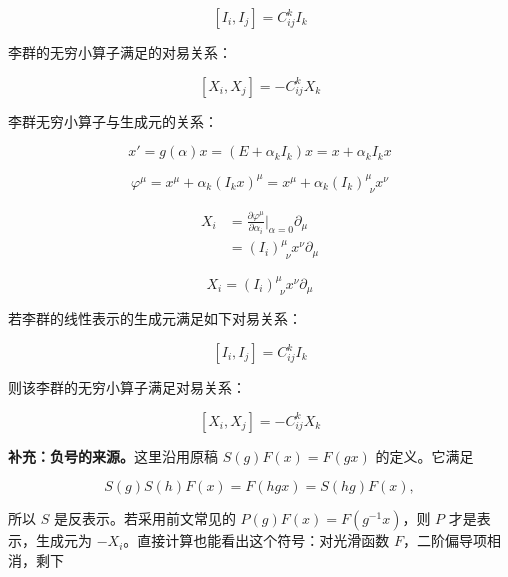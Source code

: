 \begin{equation}
\left[I_i,I_j \right] = C_{ij}^k I_k
\end{equation}

李群的无穷小算子满足的对易关系：

\begin{equation}
\left[X_i,X_j \right] = -C_{ij}^k X_k
\end{equation}

李群无穷小算子与生成元的关系：

\begin{equation}
x'
=g\left(\alpha\right) x
=\left(E+\alpha_k I_k \right) x
=x + \alpha_k I_k x
\end{equation}

\begin{equation}
\varphi^\mu
=x^\mu + \alpha_k \left(I_k x \right)^\mu
=x^\mu + \alpha_k \left(I_k \right)^{\mu}_{~~\nu} x^{\nu}
\end{equation}

\begin{align}
X_i
&=\frac{\partial \varphi^\mu }{\partial \alpha_i } \bigg|_{\alpha=0} \partial_\mu \\
&=\left(I_i \right)^\mu_{~~\nu} x^{\nu} \partial_\mu
\end{align}

\begin{equation}
X_i = \left(I_i \right)^{\mu}_{~~\nu} x^{\nu} \partial_\mu
\end{equation}

若李群的线性表示的生成元满足如下对易关系：

\begin{equation}
\left[I_i,I_j \right] = C_{ij}^k I_k
\end{equation}

则该李群的无穷小算子满足对易关系：

\begin{equation}
\left[X_i,X_j \right] = -C_{ij}^k X_k
\end{equation}

\textbf{补充：负号的来源。}这里沿用原稿 $S\left(g\right)F\left(x\right)=F\left(gx\right)$ 的定义。它满足

\begin{equation}
S\left(g\right)S\left(h\right)F\left(x\right)=F\left(hgx\right)=S\left(hg\right)F\left(x\right),
\end{equation}

所以 $S$ 是反表示。若采用前文常见的 $P\left(g\right)F\left(x\right)=F\left(g^{-1}x\right)$，则 $P$ 才是表示，生成元为 $-X_i$。直接计算也能看出这个符号：对光滑函数 $F$，二阶偏导项相消，剩下

